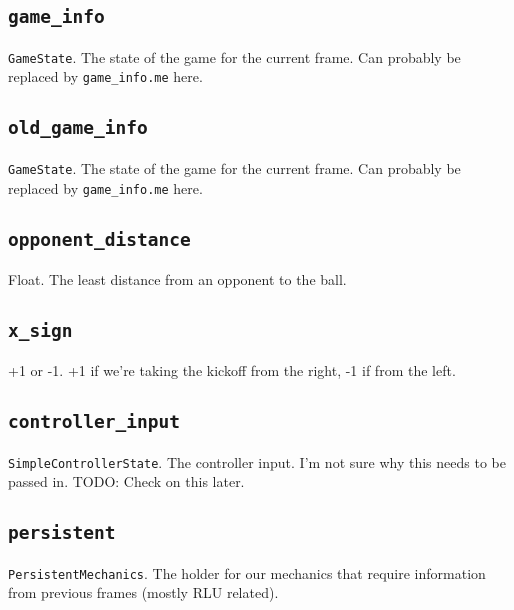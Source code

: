 \documentclass{article}
\newcommand{\argumenta}[1]{\subsection{\texttt{#1}}}
\begin{document}
\begin{flushleft}
{           \argumenta{game\_info}
                     {
                       \texttt{GameState}.  The state of the game for the current frame.  Can probably be replaced by \texttt{game\_info.me} here.
                     }
           \argumenta{old\_game\_info}
                     {
                       \texttt{GameState}.  The state of the game for the current frame.  Can probably be replaced by \texttt{game\_info.me} here.
                     }
           \argumenta{opponent\_distance}
                     {
                       Float.  The least distance from an opponent to the ball.
                     }
           \argumenta{x\_sign}
                     {
                       +1 or -1.  +1 if we're taking the kickoff from the right, -1 if from the left.
                     }
           \argumenta{controller\_input}
                     {
                       \texttt{SimpleControllerState}.  The controller input.  I'm not sure why this needs to be passed in.  TODO: Check on this later.
                     }
           \argumenta{persistent}
                     {
                       \texttt{PersistentMechanics}.  The holder for our mechanics that require information from previous frames (mostly RLU related).
                     }
         }























  
  





\end{flushleft}
\end{document}
